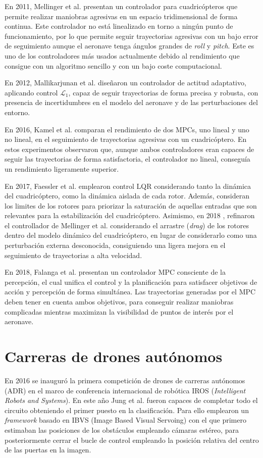 En 2011, Mellinger et al. \cite{MinimunSnap2011} presentan un controlador para cuadricópteros que permite realizar maniobras agresivas en un espacio tridimensional de forma continua. Este controlador no está linealizado en torno a ningún punto de funcionamiento, por lo que permite seguir trayectorias agresivas con un bajo error de seguimiento aunque el aeronave tenga ángulos grandes de \textit{roll} y \textit{pitch}. Este es uno de los controladores más usados actualmente debido al rendimiento que consigue con un algoritmo sencillo y con un bajo coste computacional.

En 2012, Mallikarjunan et al. \cite{mallikarjunan2012l1} diseñaron un controlador de actitud adaptativo, aplicando control $\mathcal{L}_1$, capaz de seguir trayectorias de forma precisa y robusta, con presencia de incertidumbres en el modelo del aeronave y de las perturbaciones del entorno.

En 2016, Kamel et al. \cite{KamelMPC2016} comparan el rendimiento de dos MPCs, uno lineal y uno no lineal, en el seguimiento de trayectorias agresivas con un cuadricóptero. En estos experimentos observaron que, aunque ambos controladores eran capaces de seguir las trayectorias de forma satisfactoria, el controlador no lineal, conseguía un rendimiento ligeramente superior.

En 2017, Faessler et al. \cite{Faessler17ral} emplearon control LQR considerando tanto la dinámica del cuadricóptero, como la dinámica aislada de cada rotor. Además, consideran los limites de los rotores para priorizar la saturación de aquellas entradas que son relevantes para la estabilización del cuadricóptero. Asimismo, en 2018 \cite{Faessler18ral}, refinaron el controllador de Mellinger et al. considerando el arrastre (\textit{drag}) de los rotores dentro del modelo dinámico del cuadricóptero, en lugar de considerarlo como una perturbación externa desconocida, consiguiendo una ligera mejora en el seguimiento de trayectorias a alta velocidad.
 
En 2018, Falanga et al. \cite{falanga2018pampc} presentan un controlador MPC consciente de la percepción, el cual unifica el control y la planificación para satisfacer objetivos de acción y percepción de forma simultánea. Las trayectorias generadas por el MPC deben tener en cuenta ambos objetivos, para conseguir realizar maniobras complicadas mientras maximizan la visibilidad de puntos de interés por el aeronave.


\section{Carreras de drones autónomos}
En 2016 se inauguró la primera competición de drones de carreras autónomos (ADR) en el marco de conferencia internacional de robótica IROS (\textit{Intelligent Robots and Systems}). En este año Jung et al.\cite{iros2016} fueron capaces de completar todo el circuito obteniendo el primer puesto en la clasificación. Para ello emplearon un \textit{framework} basado en IBVS (Image Based Visual Servoing) con el que primero estimaban las posiciones de los obstáculos empleando cámaras estéreo, para posteriormente cerrar el bucle de control empleando la posición relativa del centro de las puertas en la imagen. 

